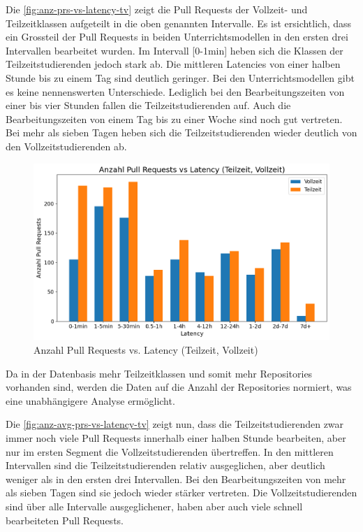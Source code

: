 Die \autoref{fig:anz-prs-vs-latency-tv} zeigt die Pull Requests der Vollzeit- und Teilzeitklassen aufgeteilt in die oben genannten Intervalle. Es ist ersichtlich, dass ein Grossteil der Pull Requests in beiden Unterrichtsmodellen in den ersten drei Intervallen bearbeitet wurden. Im Intervall [0-1min] heben sich die Klassen der Teilzeitstudierenden jedoch stark ab. 
Die mittleren Latencies von einer halben Stunde bis zu einem Tag sind deutlich geringer. Bei den Unterrichtsmodellen gibt es keine nennenswerten Unterschiede. Lediglich bei den Bearbeitungszeiten von einer bis vier Stunden fallen die Teilzeitstudierenden auf. Auch die Bearbeitungszeiten von einem Tag bis zu einer Woche sind noch gut vertreten. Bei mehr als sieben Tagen heben sich die Teilzeitstudierenden wieder deutlich von den Vollzeitstudierenden ab.

\begin{figure}[htbp]
    \includegraphics[width=\textwidth]{Figures/anz-prs-vs-latency-tv.png}
    \caption{Anzahl Pull Requests vs. Latency (Teilzeit, Vollzeit)}
    \label{fig:anz-prs-vs-latency-tv}
\end{figure}

Da in der Datenbasis mehr Teilzeitklassen und somit mehr Repositories vorhanden sind, werden die Daten auf die Anzahl der Repositories normiert, was eine unabhängigere Analyse ermöglicht.

Die \autoref{fig:anz-avg-prs-vs-latency-tv} zeigt nun, dass die Teilzeitstudierenden zwar immer noch viele Pull Requests innerhalb einer halben Stunde bearbeiten, aber nur im ersten Segment die Vollzeitstudierenden übertreffen. In den mittleren Intervallen sind die Teilzeitstudierenden relativ ausgeglichen, aber deutlich weniger als in den ersten drei Intervallen. Bei den Bearbeitungszeiten von mehr als sieben Tagen sind sie jedoch wieder stärker vertreten. Die Vollzeitstudierenden sind über alle Intervalle ausgeglichener, haben aber auch viele schnell bearbeiteten Pull Requests.


